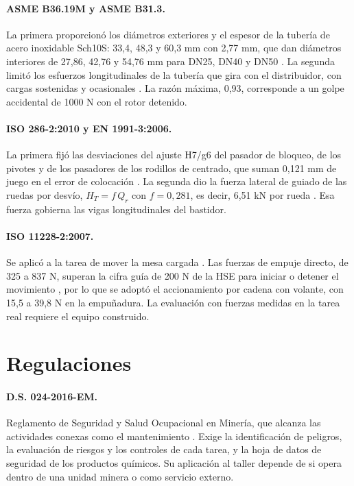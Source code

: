 \paragraph{ASME B36.19M y ASME B31.3.} La primera proporcionó los diámetros exteriores y el espesor de la tubería de acero inoxidable Sch10S: 33,4, 48,3 y 60,3 mm con 2,77 mm, que dan diámetros interiores de 27,86, 42,76 y 54,76 mm para DN25, DN40 y DN50 \cite{asmeb3619}. La segunda limitó los esfuerzos longitudinales de la tubería que gira con el distribuidor, con cargas sostenidas y ocasionales \cite{asmeb313}. La razón máxima, 0,93, corresponde a un golpe accidental de 1000 N con el rotor detenido.

\paragraph{ISO 286-2:2010 y EN 1991-3:2006.} La primera fijó las desviaciones del ajuste H7/g6 del pasador de bloqueo, de los pivotes y de los pasadores de los rodillos de centrado, que suman 0,121 mm de juego en el error de colocación \cite{iso286}. La segunda dio la fuerza lateral de guiado de las ruedas por desvío, $H_T=f\,Q_r$ con $f=0{,}281$, es decir, 6,51 kN por rueda \cite{en19913}. Esa fuerza gobierna las vigas longitudinales del bastidor.

\paragraph{ISO 11228-2:2007.} Se aplicó a la tarea de mover la mesa cargada \cite{iso11228}. Las fuerzas de empuje directo, de 325 a 837 N, superan la cifra guía de 200 N de la HSE para iniciar o detener el movimiento \cite{hsepushpull}, por lo que se adoptó el accionamiento por cadena con volante, con 15,5 a 39,8 N en la empuñadura. La evaluación con fuerzas medidas en la tarea real requiere el equipo construido.

\section{Regulaciones}

\paragraph{D.S. 024-2016-EM.} Reglamento de Seguridad y Salud Ocupacional en Minería, que alcanza las actividades conexas como el mantenimiento \cite{ds024}. Exige la identificación de peligros, la evaluación de riesgos y los controles de cada tarea, y la hoja de datos de seguridad de los productos químicos. Su aplicación al taller depende de si opera dentro de una unidad minera o como servicio externo.

